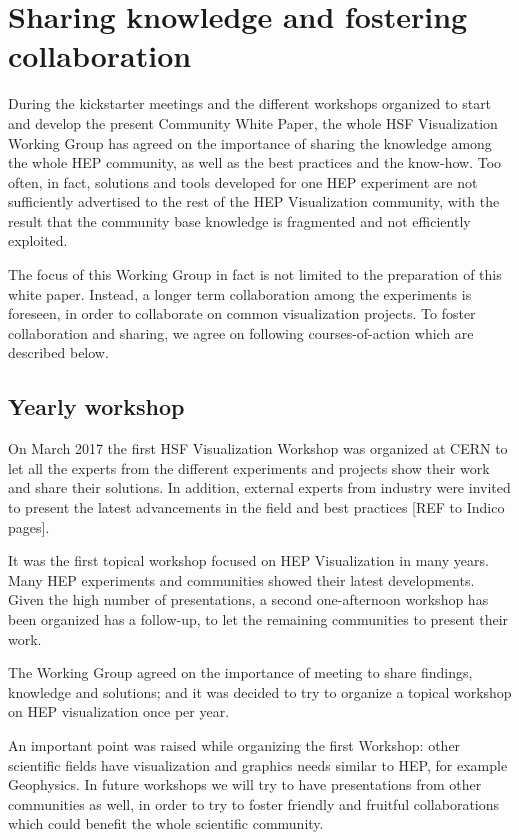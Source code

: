 \documentclass[12pt,a4paper]{article}
\begin{document}
\hypertarget{sharing-knowledge}{%
\section{Sharing knowledge and fostering collaboration}\label{sharing-knowledge}}

During the kickstarter meetings and the different workshops organized to start and develop the present Community White Paper,
the whole HSF Visualization Working Group has agreed on the importance of sharing the knowledge among the whole HEP community,
as well as the best practices and the know-how. Too often, in fact, solutions and tools developed for one HEP experiment are
not sufficiently advertised to the rest of the HEP Visualization community, with the result that the community base knowledge
is fragmented and not efficiently exploited.

The focus of this Working Group in fact is not limited to the preparation of this white paper. Instead, a longer term collaboration
among the experiments is foreseen, in order to collaborate on common visualization projects.
To foster collaboration and sharing, we agree on following courses-of-action which are described below.

\hypertarget{workshop}{%
\subsection{Yearly workshop}\label{workshop}}

On March 2017 the first HSF Visualization Workshop was organized at CERN to let all the experts from the different experiments and projects
show their work and share their solutions. In addition, external experts from industry were invited to present the latest
advancements in the field and best practices [REF to Indico pages].

It was the first topical workshop focused on HEP Visualization in many years. Many HEP
experiments and communities showed their latest developments. Given the high number of presentations, a second one-afternoon
workshop has been organized has a follow-up, to let the remaining communities to present their work.

The Working Group agreed on the importance of meeting to share findings, knowledge and solutions; and it was decided to
try to organize a topical workshop on HEP visualization once per year.

An important point was raised while organizing the first Workshop: other scientific fields have visualization and
graphics needs similar to HEP, for example Geophysics. In future workshops we will try to
have presentations from other communities as well, in order to try to foster friendly and fruitful collaborations
which could benefit the whole scientific community.
\end{document}
